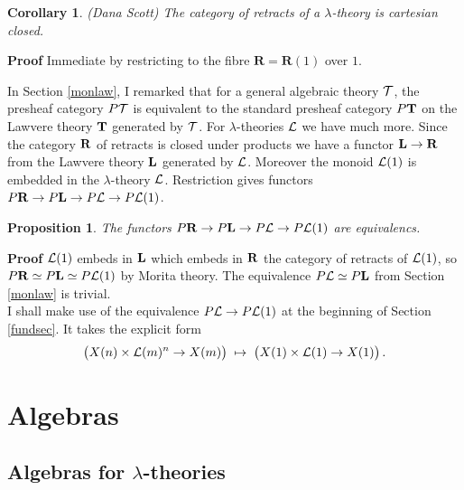 \documentclass[12pt, amstex, amssymb]{article}
\newtheorem{proposition}[theorem]{Proposition}
\newtheorem{corollary}[theorem]{Corollary}
\newcommand{\mcat}{\cal}
\newcommand{\cat}{\mathbf}
\begin{document}
\begin{corollary}\label{retracts} {\rm (Dana Scott})
The category of retracts of a $\lambda$-theory is cartesian closed. 
\end{corollary}
{\bf Proof} Immediate by restricting 
to the fibre ${\cat R} = {\cat R}(1)$ over $1$.


In Section \ref{monlaw}, I remarked that for a general algebraic
theory $\mcat T$, the presheaf category $P{\mcat T}$ is equivalent
to the standard presheaf category $P{\bf T}$ on the Lawvere theory
$\bf T$ generated by $\mcat T$.
For $\lambda$-theories $\mcat L$ we have much more.
Since the category $\bf R$ of retracts is closed under products
we have a functor ${\bf L} \to {\bf R}$ from the Lawvere theory
$\bf L$ generated by $\mcat L$. Moreover the monoid
${\mcat L}(1)$ is embedded in the $\lambda$-theory $\mcat L$.
Restriction gives functors 
$P{\bf R} \to P{\bf L} \to P{\mcat L} \to P{\mcat L}(1)$. 
\begin{proposition}\label{morita}
The functors $P{\bf R} \to P{\bf L} \to P{\mcat L} \to P{\mcat L}(1)$
are equivalencs.
\end{proposition} 
{\bf Proof} ${\mcat L}(1)$ embeds in $\bf L$
which embeds in $\bf R$ the category of retracts of ${\mcat L}(1)$,
so $P{\bf R} \simeq P{\bf L} \simeq P{\mcat L}(1)$ by Morita theory. 
The equivalence $P{\mcat L} \simeq P{\cat L}$ from Section \ref{monlaw} is
trivial.\\[0.4em]
I shall make use of the equivalence $P{\mcat L} \to P{\mcat L}(1)$
at the beginning of Section \ref{fundsec}. It takes the explicit
form
\[
\big( X(n) \times {\mcat L}(m)^n \to X(m) \big) \; \mapsto \;
\big( X(1) \times {\mcat L}(1) \to X(1) \big) \, . 
\]

\section{Algebras}

\subsection{Algebras for $\lambda$-theories}
\end{document}
